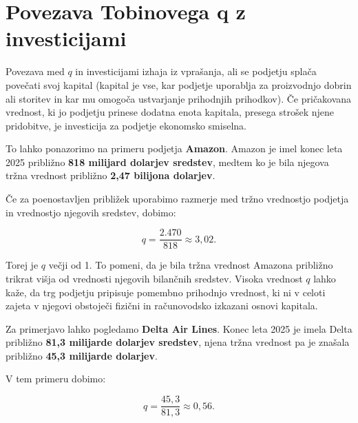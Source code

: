 \documentclass[12pt,a4paper]{article}
\begin{document}

\section{Povezava Tobinovega q z investicijami}




Povezava med $q$ in investicijami izhaja iz vprašanja, ali se podjetju splača povečati svoj kapital (kapital je vse, kar podjetje uporablja za proizvodnjo dobrin ali storitev in kar mu omogoča ustvarjanje prihodnjih prihodkov). Če pričakovana vrednost, ki jo podjetju prinese dodatna enota kapitala, presega strošek njene pridobitve, je investicija za podjetje ekonomsko smiselna.



To lahko ponazorimo na primeru podjetja \textbf{Amazon}. Amazon je imel konec leta 2025 približno \textbf{818 milijard dolarjev sredstev}, medtem ko je bila njegova tržna vrednost približno \textbf{2,47 bilijona dolarjev}.



Če za poenostavljen približek uporabimo razmerje med tržno vrednostjo podjetja in vrednostjo njegovih sredstev, dobimo:



\begin{equation}
q = \frac{2.470}{818} \approx 3,02.
\end{equation}



Torej je $q$ večji od 1. To pomeni, da je bila tržna vrednost Amazona približno trikrat višja od vrednosti njegovih bilančnih sredstev. Visoka vrednost $q$ lahko kaže, da trg podjetju pripisuje pomembno prihodnjo vrednost, ki ni v celoti zajeta v njegovi obstoječi fizični in računovodsko izkazani osnovi kapitala.



Za primerjavo lahko pogledamo \textbf{Delta Air Lines}. Konec leta 2025 je imela Delta približno \textbf{81,3 milijarde dolarjev sredstev}, njena tržna vrednost pa je znašala približno \textbf{45,3 milijarde dolarjev}.



V tem primeru dobimo:



\begin{equation}
q = \frac{45,3}{81,3} \approx 0,56.
\end{equation}
\end{document}
